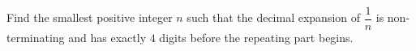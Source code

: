 Find the smallest positive integer $n$ such that the decimal expansion of $\dfrac{1}{n}$ is non-terminating and has exactly $4$ digits before the repeating part begins.
